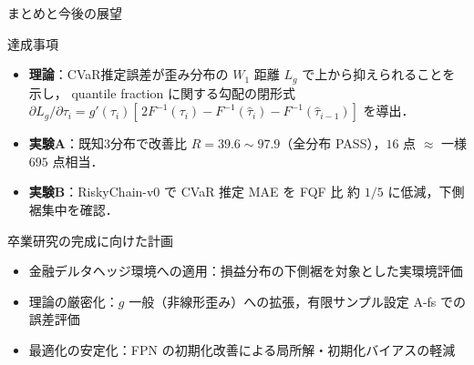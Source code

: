 \documentclass[aspectratio=169, 10pt]{beamer}
\newcommand{\blue}[1]{\textcolor{blue!80!black}{#1}}
\providecommand{\Finv}{}\renewcommand{\Finv}{F^{-1}}
\newcommand{\Lg}{L_g}
\begin{document}
\begin{frame}{まとめと今後の展望}
  \begin{exampleblock}{達成事項}
    \begin{itemize}
      \item \textbf{理論}：CVaR推定誤差が歪み分布の $W_1$ 距離 $\Lg$ で上から抑えられることを示し，
            quantile fraction に関する勾配の閉形式
            $\partial\Lg/\partial\tau_i=g'(\tau_i)[\,2\Finv(\tau_i)-\Finv(\hat\tau_i)-\Finv(\hat\tau_{i-1})]$ を導出．
      \item \textbf{実験A}：既知3分布で改善比 $R=39.6\sim97.9$（全分布 PASS），$16$ 点 $\approx$ 一様 $695$ 点相当．
      \item \textbf{実験B}：RiskyChain-v0 で CVaR 推定 MAE を FQF 比 約 $1/5$ に低減，下側裾集中を確認．
    \end{itemize}
  \end{exampleblock}
  \begin{block}{卒業研究の完成に向けた計画}
    \begin{itemize}
      \item \blue{金融デルタヘッジ環境}への適用：損益分布の下側裾を対象とした実環境評価
      \item \blue{理論の厳密化}：$g$ 一般（非線形歪み）への拡張，有限サンプル設定 A-fs での誤差評価
      \item \blue{最適化の安定化}：FPN の初期化改善による局所解・初期化バイアスの軽減
    \end{itemize}
  \end{block}
\end{frame}

\appendix
\end{document}
